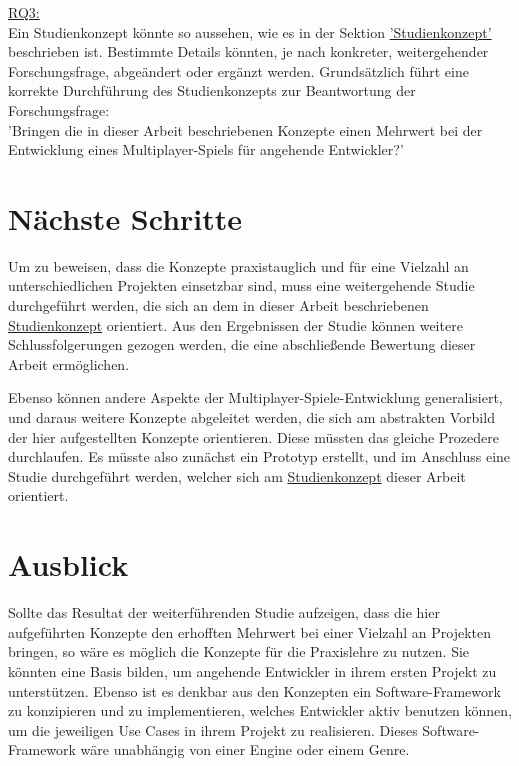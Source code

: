 \hyperref[RQ3]{RQ3:} \\
Ein Studienkonzept könnte so aussehen, wie es in der Sektion \hyperref[studienkonzept]{'Studienkonzept'} beschrieben ist. Bestimmte Details könnten, je nach konkreter, weitergehender Forschungsfrage, abgeändert oder ergänzt werden. Grundsätzlich führt eine korrekte Durchführung des Studienkonzepts zur Beantwortung der Forschungsfrage: \\
'Bringen die in dieser Arbeit beschriebenen Konzepte einen Mehrwert bei der Entwicklung eines Multiplayer-Spiels für angehende Entwickler?'

\section{Nächste Schritte}

Um zu beweisen, dass die Konzepte praxistauglich und für eine Vielzahl an unterschiedlichen Projekten einsetzbar sind, muss eine weitergehende Studie durchgeführt werden, die sich an dem in dieser Arbeit beschriebenen \hyperref[studienkonzept]{Studienkonzept} orientiert. Aus den Ergebnissen der Studie können weitere Schlussfolgerungen gezogen werden, die eine abschließende Bewertung dieser Arbeit ermöglichen. 

Ebenso können andere Aspekte der Multiplayer-Spiele-Entwicklung generalisiert, und daraus weitere Konzepte abgeleitet werden, die sich am abstrakten Vorbild der hier aufgestellten Konzepte orientieren. Diese müssten das gleiche Prozedere durchlaufen. Es müsste also zunächst ein Prototyp erstellt, und im Anschluss eine Studie durchgeführt werden, welcher sich am \hyperref[studienkonzept]{Studienkonzept} dieser Arbeit orientiert.

\section{Ausblick}

Sollte das Resultat der weiterführenden Studie aufzeigen, dass die hier aufgeführten Konzepte den erhofften Mehrwert bei einer Vielzahl an Projekten bringen, so wäre es möglich die Konzepte für die Praxislehre zu nutzen. Sie könnten eine Basis bilden, um angehende Entwickler in ihrem ersten Projekt zu unterstützen. Ebenso ist es denkbar aus den Konzepten ein Software-Framework zu konzipieren und zu implementieren, welches Entwickler aktiv benutzen können, um die jeweiligen Use Cases in ihrem Projekt zu realisieren. Dieses Software-Framework wäre unabhängig von einer Engine oder einem Genre.